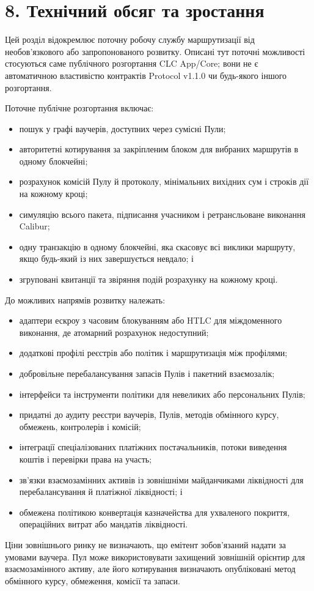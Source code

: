 \documentclass[11pt]{article}
\begin{document}
\section*{8. Технічний обсяг та зростання}

Цей розділ відокремлює поточну робочу службу маршрутизації від необов'язкового або запропонованого розвитку. Описані тут поточні можливості стосуються саме публічного розгортання CLC App/Core; вони не є автоматичною властивістю контрактів Protocol v1.1.0 чи будь-якого іншого розгортання.

Поточне публічне розгортання включає:

\begin{itemize}[leftmargin=*]
\item пошук у графі ваучерів, доступних через сумісні Пули;
\item авторитетні котирування за закріпленим блоком для вибраних маршрутів в одному блокчейні;
\item розрахунок комісій Пулу й протоколу, мінімальних вихідних сум і строків дії на кожному кроці;
\item симуляцію всього пакета, підписання учасником і ретрансльоване виконання Calibur;
\item одну транзакцію в одному блокчейні, яка скасовує всі виклики маршруту, якщо будь-який із них завершується невдало; і
\item згруповані квитанції та звіряння подій розрахунку на кожному кроці.
\end{itemize}
До можливих напрямів розвитку належать:

\begin{itemize}[leftmargin=*]
\item адаптери ескроу з часовим блокуванням або HTLC для міждоменного виконання, де атомарний розрахунок недоступний;
\item додаткові профілі реєстрів або політик і маршрутизація між профілями;
\item добровільне перебалансування запасів Пулів і пакетний взаємозалік;
\item інтерфейси та інструменти політики для невеликих або персональних Пулів;
\item придатні до аудиту реєстри ваучерів, Пулів, методів обмінного курсу, обмежень, контролерів і комісій;
\item інтеграції спеціалізованих платіжних постачальників, потоки виведення коштів і перевірки права на участь;
\item зв'язки взаємозамінних активів із зовнішніми майданчиками ліквідності для перебалансування й платіжної ліквідності; і
\item обмежена політикою конвертація казначейства для ухваленого покриття, операційних витрат або мандатів ліквідності.
\end{itemize}
Ціни зовнішнього ринку не визначають, що емітент зобов'язаний надати за умовами ваучера. Пул може використовувати захищений зовнішній орієнтир для взаємозамінного активу, але його котирування визначають опубліковані метод обмінного курсу, обмеження, комісії та запаси.
\end{document}
